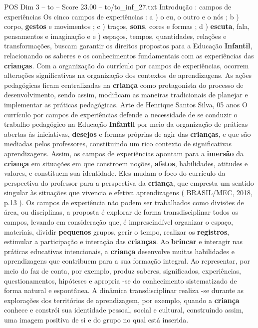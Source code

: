 \begin{textsample}{POS Dim 3 – to – Score 23.00 – to/to\_inf\_27.txt}  \label{ex:f3_pos_108}
Introdução : campos de experiências Os cinco campos de experiências : a ) o eu, o outro e o nós ; b ) corpo, \textbf{gestos} e movimentos ; c ) traços, \textbf{sons}, cores e formas ; d ) \textbf{escuta}, fala, pensamentos e imaginação e e ) espaços, tempos, quantidades, relações e transformações, buscam garantir os direitos propostos para a Educação \textbf{Infantil}, relacionando os saberes e os conhecimentos fundamentais com as experiências das \textbf{crianças}.
Com a organização do currículo por campos de experiências, ocorrem alterações significativas na organização dos contextos de aprendizagens.
As ações pedagógicas ficam centralizadas na \textbf{criança} como protagonista do processo de desenvolvimento, sendo assim, modificam as maneiras tradicionais de planejar e implementar as práticas pedagógicas.
Arte de Henrique Santos Silva, 05 anos O currículo por campos de experiências defende a necessidade de se conduzir o trabalho pedagógico na Educação \textbf{Infantil} por meio da organização de práticas abertas às iniciativas, \textbf{desejos} e formas próprias de agir das \textbf{crianças}, e que são mediadas pelos professores, constituindo um rico contexto de significativas aprendizagens.
Assim, os campos de experiências apontam para a \textbf{imersão} da \textbf{criança} em situações em que constroem noções, \textbf{afetos}, habilidades, atitudes e valores, e constituem sua identidade.
Eles mudam o foco do currículo da perspectiva do professor para a perspectiva da \textbf{criança}, que empresta um sentido singular às situações que vivencia e efetiva aprendizagens ( BRASIL/MEC, 2018, p.13 ).
Os campos de experiência não podem ser trabalhados como divisões de área, ou disciplinas, a proposta é explorar de forma transdisciplinar todos os campos, levando em consideração que, é imprescindível organizar o espaço, materiais, dividir \textbf{pequenos} grupos, gerir o tempo, realizar os \textbf{registros}, estimular a participação e interação das \textbf{crianças}.
Ao \textbf{brincar} e interagir nas práticas educativas intencionais, a \textbf{criança} desenvolve muitas habilidades e aprendizagens que contribuem para a sua formação integral.
Ao representar, por meio do faz de conta, por exemplo, produz saberes, significados, experiências, questionamentos, hipóteses e apropria -se do conhecimento sistematizado de forma natural e espontânea.
A dinâmica transdisciplinar realiza -se durante as explorações dos territórios de aprendizagem, por exemplo, quando a \textbf{criança} conhece e constrói sua identidade pessoal, social e cultural, construindo assim, uma imagem positiva de si e do grupo no qual está inserida.

\end{textsample}
